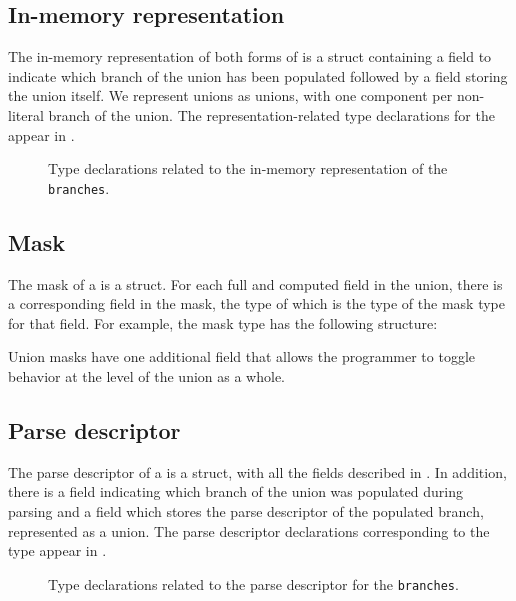 \subsection{In-memory representation}
\label{sec:unions-rep}
The in-memory representation of both forms of \Punion{} is 
a \C{} struct containing a  field to indicate which branch of the
union has been populated followed by a  field storing the union
itself.  We represent unions as \C{} unions, with one component per
non-literal branch of the union.  
The representation-related type declarations for
the \Punion{}  appear in .

\begin{figure}

\caption{Type declarations related to the in-memory representation of
  the \Punion{} \texttt{branches}.}
\label{fig:punion-rep}
\end{figure}

\subsection{Mask}
\label{sec:unions-masks}
The mask of a \Punion{} is a \C{} struct.  
For each full and computed field in the union,
there is a corresponding field in the mask, the type of which is the
type of the mask type for that field.   For example, the mask type
 has the following structure:

Union masks have one additional field  that allows the
programmer to toggle behavior at the level of the union as a whole.

\subsection{Parse descriptor}
\label{sec:unions-parse-descriptors}
The parse descriptor of a \Punion{} is a \C{} struct, with all
the fields described in . In
addition,  there is a  field indicating which branch of the
union was populated during parsing and a  field which stores
the parse descriptor of the populated branch, represented as a \C{}
union.  The parse descriptor declarations corresponding to the
\pads{} type 
appear in .

\begin{figure}

\caption{Type declarations related to the parse descriptor for
  the \Punion{} \texttt{branches}.}
\label{fig:punion-pd}
\end{figure}

